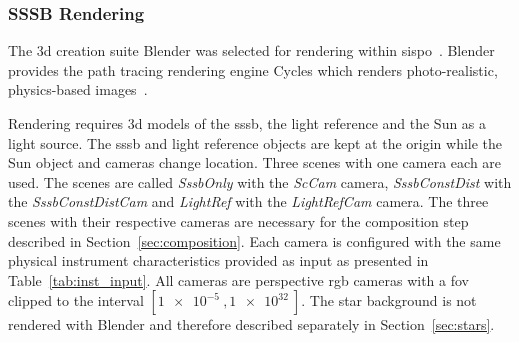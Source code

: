 \begin{table}[htb]
    \centering
    \caption{Input parameters that define the propagation step in~\gls{sispo}.}
    \label{tab:sim_prop_input}
\end{table}


\subsubsection{SSSB Rendering}
The \gls{3d} creation suite Blender was selected for rendering within \gls{sispo}~\cite{blender}. Blender provides the path tracing rendering engine Cycles which renders photo-realistic, physics-based images~\cite{Cycles}.

Rendering requires \gls{3d} models of the \gls{sssb}, the light reference and the Sun as a light source. The \gls{sssb} and light reference objects are kept at the origin while the Sun object and cameras change location. Three scenes with one camera each are used. The scenes are called \textit{SssbOnly} with the \textit{ScCam} camera, \textit{SssbConstDist} with the \textit{SssbConstDistCam} and \textit{LightRef} with the \textit{LightRefCam} camera. The three scenes with their respective cameras are necessary for the composition step described in Section~\ref{sec:composition}. Each camera is configured with the same physical instrument characteristics provided as input as presented in Table~\ref{tab:inst_input}. All cameras are perspective \gls{rgb} cameras with a \gls{fov} clipped to the interval $[\SI{1e-5}{},\SI{1e32}{}]$. The star background is not rendered with Blender and therefore described separately in Section~\ref{sec:stars}.

